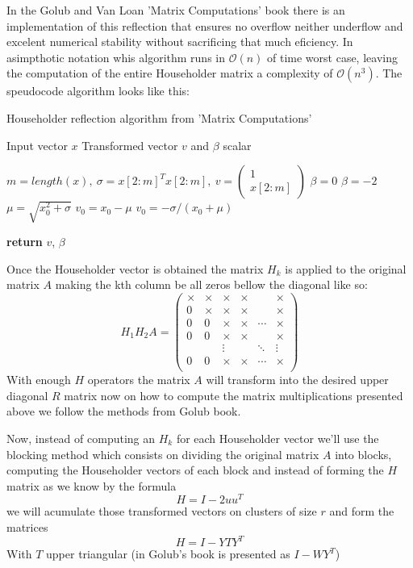 \documentclass{scrartcl}
\begin{document}
  In the Golub and Van Loan 'Matrix Computations' book there is an implementation of this reflection that ensures no overflow neither underflow and excelent numerical stability without sacrificing that much eficiency. In asimpthotic notation whis algorithm runs in $\mathcal{O}(n)$ of time worst case, leaving the computation of the entire Householder matrix a complexity of $\mathcal{O}(n^3)$. The speudocode algorithm looks like this:

\begin{algorithm}[H]
    \caption{Householder reflection algorithm from 'Matrix Computations'}
    \label{alg:householder_reflection}
    \begin{algorithmic}[0]
        \REQUIRE Input vector $x$
        \ENSURE Transformed vector $v$ and $\beta$ scalar

        \STATE $m = length(x),\ \sigma = x[2:m]^T x[2:m],\ v = \begin{pmatrix} 1 \\ x[2:m] \end{pmatrix}$
            \STATE $\beta = 0$
            \STATE $\beta = -2$
        \ELSE
            \STATE $\mu = \sqrt{x_0^2 + \sigma}$
                \STATE $v_0 = x_0 - \mu$
            \ELSE
                \STATE $v_0 = -\sigma / (x_0 + \mu)$
            \ENDIF
        \ENDIF

        \STATE \textbf{return} $v$, $\beta$
    \end{algorithmic}
\end{algorithm}

Once the Householder vector is obtained the matrix $H_k$ is applied to the original matrix $A$ making the kth column be all zeros bellow the diagonal like so:
\[ 
    H_1 H_2 A = \begin{pmatrix}
   \times & \times     & \times & \times & & \times \\
        0 &     \times & \times & \times & & \times \\
        0 & 0 & \times & \times & \cdots & \times \\
        0 & 0 & \times & \times &        & \times \\
          &   & \vdots &        & \ddots & \vdots \\
        0 & 0 & \times & \times & \cdots & \times \\
                \end{pmatrix}
\]
With enough $H$ operators the matrix $A$ will transform into the desired upper diagonal $R$ matrix now on how to compute the matrix multiplications presented above we follow the methods from Golub book.

Now, instead of computing an $H_k$ for each Householder vector we'll use the blocking method which consists on dividing the original matrix $A$ into blocks, computing the Householder vectors of each block and instead of forming the $H$ matrix as we know by the formula
\[
H = I - 2uu^T
\]
we will acumulate those transformed vectors on clusters of size $r$ and form the matrices
\[
H = I - YTY^T
\]
With $T$ upper triangular (in Golub's book is presented as $I - WY^T$)
\end{document}
